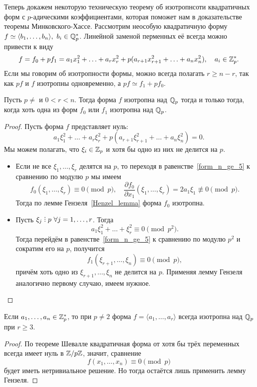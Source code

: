 	Теперь докажем некоторую техническую теорему об изотропнсоти квадратичных форм с $p$-адическими коэффициентами, которая поможет нам в доказательстве теоремы Минковского-Хассе.  	
	Рассмотрим неособую квадратичную форму $f \simeq \langle b_1, \ldots, b_n \rangle, \ b_i \in \mathbb{Q}_{p}^{*}$. Линейной заменой перменных её всегда можно привести к виду 
	\[
		f = f_0 + p f_1 = a_1 x_1^2 + \ldots + a_r x_r^2 + p(a_{r + 1}x_{r + 1}^2 + \ldots + a_{n} x_{n}^2), \quad a_i \in \mathbb{Z}_{p}^{*}.
	\]
	Если мы говорим об изотропности формы, можно всегда полагать $r \ge n - r$, так как $pf$ и $f$ изотропны одновременно, а $pf \simeq f_1 + pf_0$. 

	\begin{theorem}\label{f_0 + pf_1} 
	 	Пусть $p \neq $ и $0 < r < n$.  Тогда форма $f$ изотропна над $\mathbb{Q}_{p}$ тогда и только тогда, когда  хоть одна из форм $f_0$ или $f_1$ изотропна над $\mathbb{Q}_{p}$. 
	 \end{theorem} 
	 \begin{proof}
	 	Пусть форма $f$ представляет нуль:
	 	\begin{equation}
	 		a_1 \xi_1^2 + \ldots + a_r \xi_r^2 + p(a_{r + 1}\xi_{r + 1}^2 + \ldots + a_{n} \xi_{n}^2) = 0. \label{form_n_ge_5}
	 	\end{equation}
	 	Мы можем полагать, что $\xi_i \in \mathbb{Z}_{p}$ и хотя бы одно из них не делится на $p$. 

	 	\begin{itemize}
	 		\item Если не все $\xi_1, \ldots, \xi_r$ делятся на $p$, то переходя в равенстве~\eqref{form_n_ge_5} к сравнению по модулю $p$ мы имеем 
	 		\[
	 			f_0(\xi_1, \ldots, \xi_r) \equiv 0 \pmod{p}, \quad \frac{\partial f_0}{\partial x_1}(\xi_1, \ldots, \xi_r) = 2a_1 \xi_1 \not\equiv 0 \pmod{p}.
	 		\]
	 		Тогда по лемме Гензеля~\ref{Henzel_lemma} форма $f_0$ изотропна. 
	 		\item  Пусть $\xi_j \divby p \ \forall j = 1, \ldots, r$. Тогда 
	 		\[
	 			a_1 \xi_1^2 + \ldots + \xi_r^2 \equiv  0 \pmod{p^2}.
	 		\]
	 		Тогда перейдём в равенстве~\eqref{form_n_ge_5} к сравнению по модулю $p^2$ и сократим его на $p$, получится 
	 		\[
	 			f_1(\xi_{r + 1}, \ldots, \xi_n) \equiv 0 \pmod{p},
	 		\]
	 		причём хоть одно из $\xi_{r + 1}, \ldots, \xi_n$ не делится на $p$. Применяя лемму Гензеля аналогично первому случаю, имеем нужное. 
	 	\end{itemize}
	 \end{proof}

	 \begin{corollary}\label{r_ge_3}
	 	Если $a_1, \ldots, a_n \in \mathbb{Z}_{p}^{*}$, то при $p \neq 2$ форма $f = \langle a_1, \ldots, a_{r} \rangle$ всегда изотропна над $\mathbb{Q}_{p}$ при $r \ge 3$.
	 \end{corollary}
	 \begin{proof}
	 	По теореме Шевалле квадратичная форма от хотя бы  трёх переменных всегда имеет нуль в $\mathbb{Z}/p\mathbb{Z}$, значит, сравнение 
	 	\[
	 		f(x_1, \ldots, x_n) \equiv 0 \pmod{p}
	 	\]
	 	будет иметь нетривиальное решение. Но тогда остаётся лишь применить лемму Гензеля. 
	 \end{proof}

